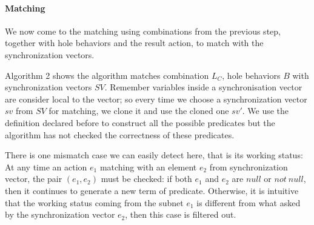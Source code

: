 \documentclass{lncs/llncs}
\begin{document}
\paragraph{Matching}

We now come to the matching using combinations from the previous step, together with hole behaviors and the result action, to match with the synchronization vectors. 

Algorithm 2 shows the algorithm matches combination $L_C$, hole
behaviors $B$ with synchronization vectors $SV$. Remember variables
inside a synchronisation vector are consider local to the vector; so every time we choose a synchronization vector $sv$ from $SV$ for matching, we clone it and use the cloned one $sv'$. We use the definition declared before to construct all the possible predicates but the algorithm has not checked the correctness of these predicates. 

There is one mismatch case we can easily detect here, that is its
working status:
At any time an action $e_1$ matching with an element $e_2$ from
synchronization vector, the pair $(e_1, e_2)$ must be checked: if both
$e_1$ and $e_2$ are $null$ or $not\ null$, then it continues to
generate a new term of predicate. Otherwise, it is intuitive that the
working status coming from the subnet $e_1$ is different from what
asked by the synchronization vector $e_2$, then this case is filtered
out.
\end{document}
